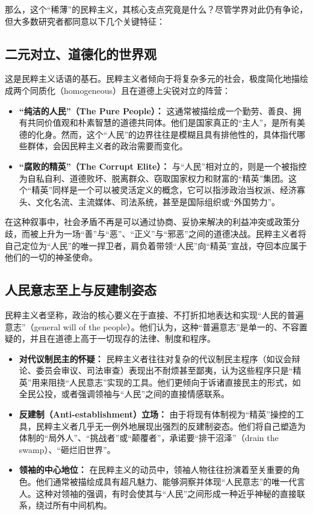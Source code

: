 \documentclass[UTF8, 10pt]{ctexbook}
\begin{document}
那么，这个“稀薄”的民粹主义，其核心支点究竟是什么？尽管学界对此仍有争论，但大多数研究者都同意以下几个关键特征：

\subsection{二元对立、道德化的世界观}
这是民粹主义话语的基石。民粹主义者倾向于将复杂多元的社会，极度简化地描绘成两个同质化（homogeneous）且在道德上尖锐对立的阵营：
    \begin{itemize}
        \item \textbf{“纯洁的人民”（The Pure People）：} 这通常被描绘成一个勤劳、善良、拥有共同价值观和朴素智慧的道德共同体。他们是国家真正的“主人”，是所有美德的化身。然而，这个“人民”的边界往往是模糊且具有排他性的，具体指代哪些群体，会因民粹主义者的政治需要而变化。
        \item \textbf{“腐败的精英”（The Corrupt Elite）：} 与“人民”相对立的，则是一个被指控为自私自利、道德败坏、脱离群众、窃取国家权力和财富的“精英”集团。这个“精英”同样是一个可以被灵活定义的概念，它可以指涉政治当权派、经济寡头、文化名流、主流媒体、司法系统，甚至是国际组织或“外国势力”。
    \end{itemize}

在这种叙事中，社会矛盾不再是可以通过协商、妥协来解决的利益冲突或政策分歧，而被上升为一场“善”与“恶”、“正义”与“邪恶”之间的道德决战。民粹主义者将自己定位为“人民”的唯一捍卫者，肩负着带领“人民”向“精英”宣战，夺回本应属于他们的一切的神圣使命。

\subsection{人民意志至上与反建制姿态}
民粹主义者坚称，政治的核心要义在于直接、不打折扣地表达和实现“人民的普遍意志”（general will of the people）。他们认为，这种“普遍意志”是单一的、不容置疑的，并且在道德上高于一切现存的法律、制度和程序。
    \begin{itemize}
        \item \textbf{对代议制民主的怀疑：} 民粹主义者往往对复杂的代议制民主程序（如议会辩论、委员会审议、司法审查）表现出不耐烦甚至鄙夷，认为这些程序只是“精英”用来阻挠“人民意志”实现的工具。他们更倾向于诉诸直接民主的形式，如全民公投，或者强调领袖与“人民”之间的直接情感联系。
        \item \textbf{反建制（Anti-establishment）立场：} 由于将现有体制视为“精英”操控的工具，民粹主义者几乎无一例外地展现出强烈的反建制姿态。他们将自己塑造为体制的“局外人”、“挑战者”或“颠覆者”，承诺要“排干沼泽”（drain the swamp）、“砸烂旧世界”。
        \item \textbf{领袖的中心地位：} 在民粹主义的动员中，领袖人物往往扮演着至关重要的角色。他们通常被描绘成具有超凡魅力、能够洞察并体现“人民意志”的唯一代言人。这种对领袖的强调，有时会使其与“人民”之间形成一种近乎神秘的直接联系，绕过所有中间机构。
    \end{itemize}
\end{document}
